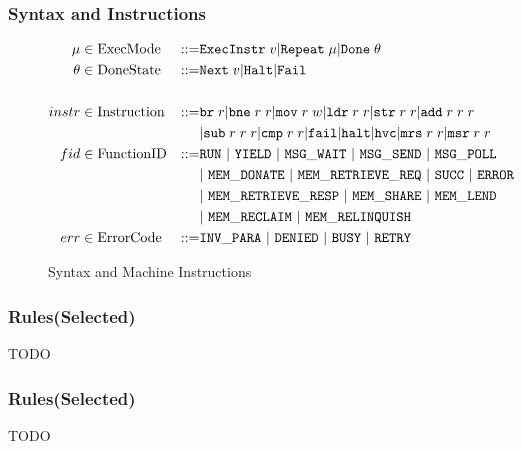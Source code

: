 \documentclass{beamer}
\newcommand*{\derived}{::=}
\newcommand*{\MODE}{\text{ExecMode}}
\newcommand*{\DONE}{\text{DoneState}}
\newcommand*{\INSTR}{\text{Instruction}}
\newcommand*{\instrm}[1]{\mathtt{#1}}
\newcommand*{\NXT}[1]{\mathtt{Next} \; {#1}}
\begin{document}
\begin{frame}
  \frametitle{Syntax and Instructions}
\begin{figure}
  \begin{align*}
    \mu &\in \MODE &\derived & \mathtt{ExecInstr} \; v | \mathtt{Repeat} \; \mu | \mathtt{Done} \; \theta \\
    \theta &\in \DONE &\derived & \NXT{v} | \mathtt{Halt} | \mathtt{Fail}\\
    \\
    instr & \in  \INSTR &\derived & \instrm{br} \; r |\instrm{bne} \; r \; r |
                                    \instrm{mov} \; r \; w | \instrm{ldr} \; r\; r|
                                    \instrm{str} \; r \; r | \instrm{add} \; r \; r \; r \\
        & & & | \instrm{sub} \; r \; r \; r | \instrm{cmp} \; r \; r | \instrm{fail} | \instrm{halt} | \instrm{hvc} |\instrm{mrs} \; r\;r | \instrm{msr} \; r \; r\\
    fid & \in \text{FunctionID} &\derived & \tt{RUN} ~|~\tt{YIELD} ~|~\tt{MSG\_WAIT} ~|~\tt{MSG\_SEND}
                                            ~|~\tt{MSG\_POLL}~ \\
        &&&|~\tt{MEM\_DONATE}~|~\tt{MEM\_RETRIEVE\_REQ} ~|~ \tt{SUCC} ~|~\tt{ERROR}\\
        &&&|~\tt{MEM\_RETRIEVE\_RESP}~|~\tt{MEM\_SHARE} ~|~ \tt{MEM\_LEND}\\
        &&&|~\tt{MEM\_RECLAIM}~|~\tt{MEM\_RELINQUISH}\\
    err & \in \text{ErrorCode} &\derived & \tt{INV\_PARA} ~|~\tt{DENIED} ~|~\tt{BUSY}~|~\tt{RETRY}
  \end{align*}
  \caption{Syntax and Machine Instructions}
\end{figure}

\end{frame}

\begin{frame}
  \frametitle{Rules(Selected)}
 TODO
\end{frame}

\begin{frame}
  \frametitle{Rules(Selected)}
 TODO
\end{frame}
\end{document}
